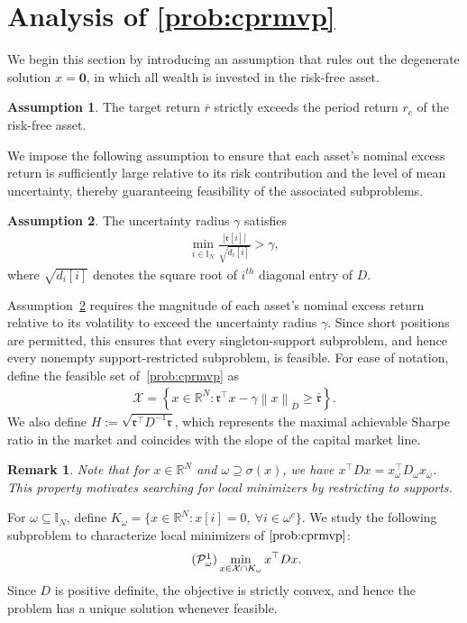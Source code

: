 \documentclass[11pt]{article}
\theoremstyle{plain}
\theoremstyle{definition}
\newtheorem{assumption}{Assumption}
\theoremstyle{plain}
\newtheorem{remark}{Remark}
\newcommand{\RR}{{\mathbb R}} %
\newcommand{\II}{{\mathbb I}}
\newcommand{\norm}[1]{\left\lVert#1\right\rVert}
\newcommand{\abs}[1]{\left\lvert#1\right\rvert}
\newcommand{\tpose}[1]{#1^{\top}}
\newcommand{\cP}{{\mathcal P}}
\newcommand{\ccr}{{\mathfrak r}}
\newcommand{\cX}{{\mathcal X}}
\begin{document}
\section{Analysis of \texorpdfstring{\eqref{prob:cprmvp}}{P1}}\label{theory1}
We begin this section by introducing an assumption that rules out the degenerate solution $x=\mathbf{0}$, in which all wealth is invested in the risk-free asset.
\begin{assumption}\label{assum:targetwealth}
The target return $\bar{r}$ strictly exceeds the period return $r_c$ of the risk-free asset.
\end{assumption}
We impose the following assumption to ensure that each asset's nominal excess return is sufficiently large relative to its risk contribution and the level of mean uncertainty, thereby guaranteeing feasibility of the associated subproblems.
\begin{assumption}\label{assump:feas}
The uncertainty radius $\gamma$ satisfies
\begin{align*}
\min_{i\in\II_N}\frac{\abs{\ccr[i]}}{\sqrt{d_i[i]}}>\gamma,
\end{align*}
where $\sqrt{d_i[i]}$ denotes the square root of $i^{th}$ diagonal entry of $D$.
\end{assumption}
Assumption~\ref{assump:feas} requires the magnitude of each asset's nominal
excess return relative to its volatility to exceed the uncertainty radius
$\gamma$. Since short positions are permitted, this ensures that every
singleton-support subproblem, and hence every nonempty support-restricted
subproblem, is feasible.
For ease of notation, define the feasible set of~\eqref{prob:cprmvp} as
\begin{align}
	\cX=\left\{x\in\RR^N:\tpose{\ccr}x-\gamma \norm{x}_D \geq \bar{\ccr}\right\}.\label{eq:cX}
\end{align}
We also define $H := \sqrt{\tpose{\ccr} D^{-1}\ccr}$, which represents the maximal achievable Sharpe ratio in the market and coincides with the slope of the capital market line.
\begin{remark}\label{rem:whyworks}
Note that for $x\in\RR^N$ and $\omega\supseteq\sigma(x)$, we have
$\tpose{x}Dx=\tpose{x_\omega}D_\omega x_\omega$.
This property motivates searching for local minimizers by restricting to supports.
\end{remark}
For $\omega\subseteq\II_N$, define $K_\omega=\{x\in\RR^N: x[i]=0,\ \forall i\in\omega^c\}$. We study the following subproblem to characterize local minimizers of $\eqref{prob:cprmvp}$:
\begin{align}\tag{$\cP^1_\omega$}\label{prob:mvp-omega}
	\min_{x\in \cX\cap K_\omega}\tpose{x}Dx.
\end{align}
Since $D$ is positive definite, the objective is strictly convex, and hence the problem has a unique solution whenever feasible.
\end{document}
